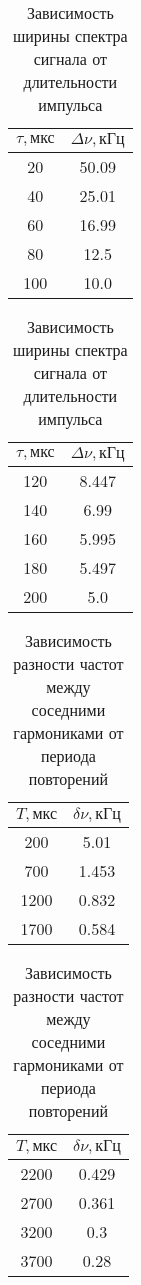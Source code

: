 \documentclass[a4paper,12pt]{article} %
\begin{document}
\begin{enumerate}
    \begin{table}[h]
	\centering
		\begin{tabular}{|c|c|}
			\hline
                $\tau, \text{мкс}$ &  $\Delta \nu, \text{кГц}$ \\ \hline
                20 & 50.09 \\ \hline
                40 & 25.01 \\ \hline
                60 & 16.99 \\ \hline
                80 & 12.5 \\ \hline
                100 & 10.0 \\ \hline
		\end{tabular}
            \hspace{.02\textwidth}
            \begin{tabular}{|c|c|}
			\hline
                $\tau, \text{мкс}$ &  $\Delta \nu, \text{кГц}$ \\ \hline
                120 & 8.447 \\ \hline
                140 & 6.99 \\ \hline
                160 & 5.995 \\ \hline
                180 & 5.497 \\ \hline
                200 & 5.0 \\ \hline
		\end{tabular}
	\caption{Зависимость ширины спектра сигнала от длительности импульса}
        \label{tab2}
    \end{table}
    \begin{table}[h]
	\centering
		\begin{tabular}{|c|c|}
			\hline
                $T, \text{мкс}$ &  $\delta \nu, \text{кГц}$ \\ \hline
                200 & 5.01 \\ \hline
                700 & 1.453 \\ \hline
                1200 & 0.832 \\ \hline
                1700 & 0.584 \\ \hline
		\end{tabular}
            \hspace{.02\textwidth}
            \begin{tabular}{|c|c|}
			\hline
                $T, \text{мкс}$ &  $\delta \nu, \text{кГц}$ \\ \hline
                2200 & 0.429 \\ \hline
                2700 & 0.361 \\ \hline
                3200 & 0.3 \\ \hline
                3700 & 0.28 \\ \hline
		\end{tabular}
	\caption{Зависимость разности частот между соседними гармониками от периода повторений}
        \label{tab3}
    \end{table}


\end{enumerate}
\end{document}
